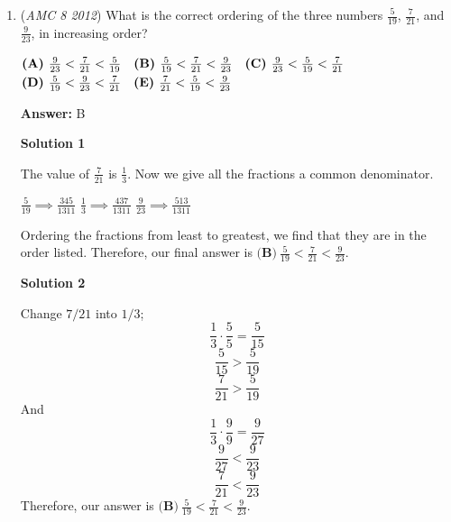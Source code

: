 \begin{enumerate}
 



\textbf{Solution 6}

Let $x$ be the number of total marbles, $r$ be the number of red marbles, $g$ be the number of green marbles, and $b$ be the number of blue marbles. Then we have $x - r = 6$, $x - g = 8$, $x - b = 4$, and $r + g + b = x$. Adding the first three equations together, we get $3x - r - g - b = 18$ or $3x - (r + g + b) = 18$. Substituting in the fourth equation, we have $3x - x = 18$ $\implies$ $\boxed{\textbf{(C)}\ 9}$.

 


	\item (\textit{AMC 8 2012}) What is the correct ordering of the three numbers $\frac{5}{19}$, $\frac{7}{21}$, and $\frac{9}{23}$, in increasing order?


 $\textbf{(A)}\hspace{.05in}\frac{9}{23}<\frac{7}{21}<\frac{5}{19}\quad\textbf{(B)}\hspace{.05in}\frac{5}{19}<\frac{7}{21}<\frac{9}{23}\quad\textbf{(C)}\hspace{.05in}\frac{9}{23}<\frac{5}{19}<\frac{7}{21}$
$\textbf{(D)}\hspace{.05in}\frac{5}{19}<\frac{9}{23}<\frac{7}{21}\quad\textbf{(E)}\hspace{.05in}\frac{7}{21}<\frac{5}{19}<\frac{9}{23}$

 \textbf{Answer: }B



\textbf{Solution 1}

The value of $\frac{7}{21}$ is $\frac{1}{3}$. Now we give all the fractions a common denominator.

 $\frac{5}{19} \implies \frac{345}{1311}$
$\frac{1}{3} \implies \frac{437}{1311}$
$\frac{9}{23} \implies \frac{513}{1311}$

 Ordering the fractions from least to greatest, we find that they are in the order listed. Therefore, our final answer is $\boxed{\textbf{(B)}\ \frac{5}{19}<\frac{7}{21}<\frac{9}{23}}$.

 



\textbf{Solution 2}

Change $7/21$ into $1/3$;
 \[\frac{1}{3}\cdot\frac{5}{5}=\frac{5}{15}\]
 \[\frac{5}{15}>\frac{5}{19}\]
 \[\frac{7}{21}>\frac{5}{19}\]And
 \[\frac{1}{3}\cdot\frac{9}{9}=\frac{9}{27}\]
 \[\frac{9}{27}<\frac{9}{23}\]
 \[\frac{7}{21}<\frac{9}{23}\]Therefore,  our answer is $\boxed{\textbf{(B)}\ \frac{5}{19}<\frac{7}{21}<\frac{9}{23}}$.


\end{enumerate}
